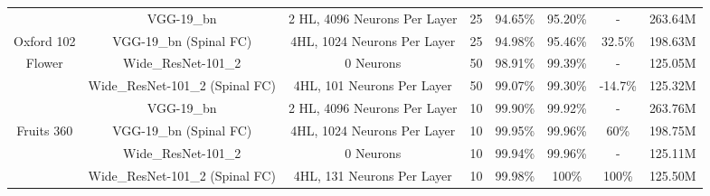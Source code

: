 \documentclass[journal]{IEEEtran}
\begin{document}
\begin{table*}
\begin{tabular}{|c|c|c|c|c|c|c|c|}
   & VGG-19\_bn & 2 HL, 4096 Neurons Per Layer & 25 & 94.65\%& 95.20\%  & - &263.64M\\  \cline{2-8}
  Oxford 102    & VGG-19\_bn (Spinal FC) & 4HL, 1024 Neurons Per Layer & 25 & 94.98\%& 95.46\%  & 32.5\% &198.63M\\  \cline{2-8}
 Flower \cite{nilsback2008automated} & Wide\_ResNet-101\_2 & 0 Neurons & 50 & 98.91\%& 99.39\%  & - & 125.05M\\  \cline{2-8}
 & Wide\_ResNet-101\_2 (Spinal FC) &  4HL, 101 Neurons Per Layer &50 & 99.07\%&99.30\% & -14.7\% &125.32M\\ \hline \hline 

   & VGG-19\_bn & 2 HL, 4096 Neurons Per Layer & 10 & 99.90\% & 99.92\% & - &263.76M\\  \cline{2-8}
  Fruits 360    & VGG-19\_bn (Spinal FC) & 4HL, 1024 Neurons Per Layer & 10 & 99.95\%& 99.96\%  & 60\% &198.75M\\  \cline{2-8}
  \cite{Fruits360} & Wide\_ResNet-101\_2 & 0 Neurons & 10 & 99.94\%&99.96\%  & - & 125.11M\\  \cline{2-8}
 & Wide\_ResNet-101\_2 (Spinal FC) &  4HL, 131 Neurons Per Layer &10 & 99.98\%&100\% & 100\% &125.50M\\ \hline 


\end{tabular}


\end{table*}
\end{document}
